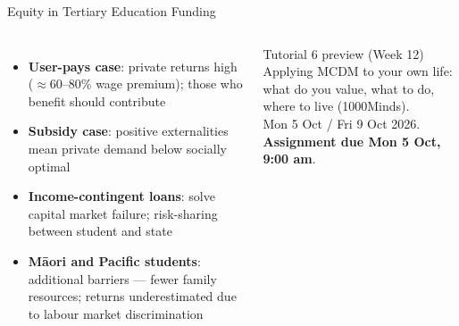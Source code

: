 \documentclass[aspectratio=169, 12pt]{beamer}
\begin{document}
\begin{frame}{Equity in Tertiary Education Funding}
  \begin{columns}
      \footnotesize
      \begin{itemize}
        \item \textbf{User-pays case}: private returns high ($\approx$60--80\% wage premium);
              those who benefit should contribute
        \item \textbf{Subsidy case}: positive externalities mean private demand below socially optimal
        \item \textbf{Income-contingent loans}: solve capital market failure;
              risk-sharing between student and state
        \item \textbf{M\=aori and Pacific students}: additional barriers --- fewer family resources;
              returns underestimated due to labour market discrimination
      \end{itemize}
      \begin{alertblock}{Tutorial 6 preview (Week 12)}
        \footnotesize
        Applying MCDM to your own life: what do you value, what to do, where to live (1000Minds).\\[0.2em]
        Mon 5 Oct / Fri 9 Oct 2026.\\[0.2em]
        \textbf{Assignment due Mon 5 Oct, 9:00 am}.
      \end{alertblock}
  \end{columns}
\end{frame}

\end{document}

